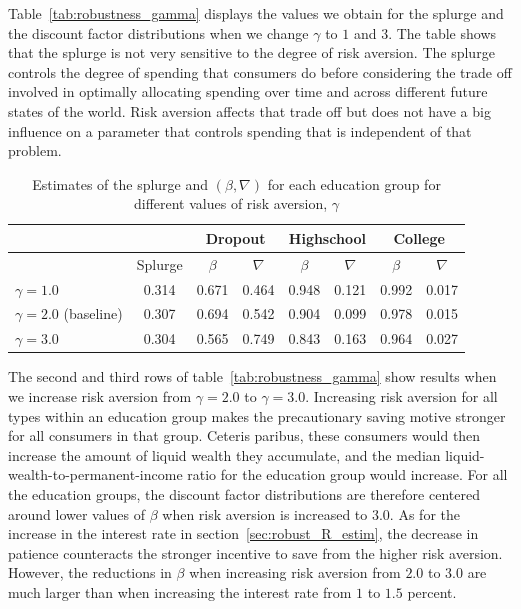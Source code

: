 \documentclass[\econtexRoot/HAFiscal]{subfiles}
\begin{document}
Table~\ref{tab:robustness_gamma} displays the values we obtain for the splurge and the discount factor distributions when we change $\gamma$ to $1$ and $3$. The table shows that the splurge is not very sensitive to the degree of risk aversion. The splurge controls the degree of spending that consumers do before considering the trade off involved in optimally allocating spending over time and across different future states of the world. Risk aversion affects that trade off but does not have a big influence on a parameter that controls spending that is independent of that problem. 

\begin{table}[t]
  \begin{center}
    \begin{tabular}{lc|cccccc} 
      \toprule
      & & \multicolumn{2}{c}{Dropout} & \multicolumn{2}{c}{Highschool} & \multicolumn{2}{c}{College} \\ \midrule 
      & Splurge & $\beta$ & $\nabla$ & $\beta$ & $\nabla$ & $\beta$ & $\nabla$ \\ \midrule 
      $\gamma = 1.0$ & 0.314 & 0.671 & 0.464 & 0.948 & 0.121 & 0.992 & 0.017 \\ 
      $\gamma = 2.0$ (baseline) & 0.307 & 0.694 & 0.542 & 0.904 & 0.099 & 0.978 & 0.015 \\
      $\gamma = 3.0$ & 0.304 & 0.565 & 0.749 & 0.843 & 0.163 & 0.964 & 0.027 
      \\ \bottomrule 
    \end{tabular}
    \caption{Estimates of the splurge and $(\beta,\nabla)$ for each education group for different values of risk aversion, $\gamma$}
    \notinsubfile{\label{tab:robustness_gamma}}
  \end{center}
\end{table}

The second and third rows of table~\ref{tab:robustness_gamma} show results when we increase risk aversion from $\gamma=2.0$ to $\gamma=3.0$. Increasing risk aversion for all types within an education group makes the precautionary saving motive stronger for all consumers in that group. Ceteris paribus, these consumers would then increase the amount of liquid wealth they accumulate, and the median liquid-wealth-to-permanent-income ratio for the education group would increase. For all the education groups, the discount factor distributions are therefore centered around lower values of $\beta$ when risk aversion is increased to $3.0$. As for the increase in the interest rate in section~\ref{sec:robust_R_estim}, the decrease in patience counteracts the stronger incentive to save from the higher risk aversion. However, the reductions in $\beta$ when increasing risk aversion from $2.0$ to $3.0$ are much larger than when increasing the interest rate from $1$ to $1.5$ percent. 
\end{document}
